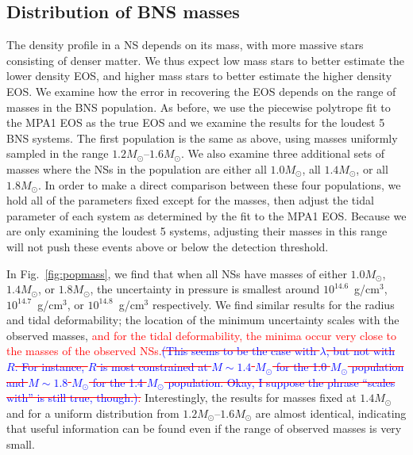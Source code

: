 \documentclass[twocolumn,prd,amssymb,aps,nofootinbib,showpacs,epsf]{revtex4}
\newcommand{\red}{\textcolor{red}}
\newcommand\ben[2]{\textcolor{red}{{#1}\sout{#2}}}
\newcommand\les[2]{\textcolor{blue}{{#1}\sout{#2}}}
\begin{document}
\subsection{Distribution of BNS masses}
\label{sec:varymass}

The density profile in a NS depends on its mass, with more massive stars consisting of denser matter. We thus expect low mass stars to better estimate the lower density EOS, and higher mass stars to better estimate the higher density EOS. We examine how the error in recovering the EOS depends on the range of masses in the BNS population. As before, we use the piecewise polytrope fit to the MPA1 EOS as the true EOS and we examine the results for the loudest 5 BNS systems. The first population is the same as above, using masses uniformly sampled in the range $1.2M_\odot$--$1.6M_\odot$. We also examine three additional sets of masses where the NSs in the population are either all $1.0M_\odot$, all $1.4M_\odot$, or all $1.8M_\odot$. In order to make a direct comparison between these four populations, we hold all of the parameters fixed except for the masses, then adjust the tidal parameter of each system as determined by the fit to the MPA1 EOS. Because we are only examining the loudest 5 systems, adjusting their masses in this range will not push these events above or below the detection threshold. 

In Fig.~\ref{fig:popmass}, we find that when all NSs have masses of either $1.0M_\odot$, $1.4M_\odot$, or $1.8M_\odot$, the uncertainty in pressure is smallest around $10^{14.6}$~g/cm$^3$, $10^{14.7}$~g/cm$^3$, or $10^{14.8}$~g/cm$^3$ respectively. We find similar results for the radius and tidal deformability; the location of the minimum uncertainty scales with the observed masses, \ben{and for the tidal deformability, the minima occur very close to the masses of the observed NSs.}{\les{(This seems to be the case with $\lambda$, but not with $R$.  For instance, $R$ is most constrained at $M\sim1.4$ $M_\odot$ for the 1.0 $M_\odot$ population and $M\sim1.8$ $M_\odot$ for the 1.4 $M_\odot$ population.  Okay, I suppose the phrase ``scales with'' is still true, though.)}{}.} Interestingly, the results for masses fixed at $1.4M_\odot$ and for a uniform distribution from $1.2M_\odot$--$1.6M_\odot$ are almost identical, indicating that useful information can be found even if the range of observed masses is very small.

\end{document}
